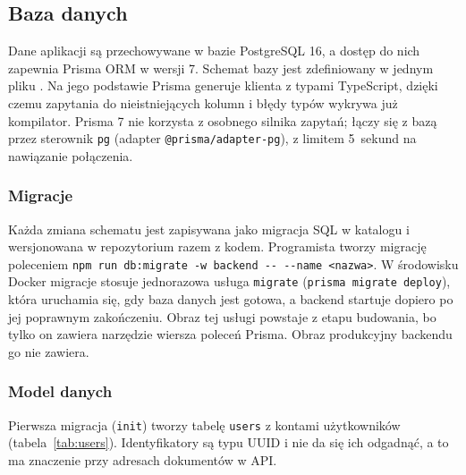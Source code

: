 \subsection{Baza danych}
\label{sec:baza-danych}

Dane aplikacji są przechowywane w bazie PostgreSQL 16,
a dostęp do nich zapewnia Prisma ORM w wersji 7. Schemat bazy
jest zdefiniowany w jednym pliku .
Na jego podstawie Prisma generuje klienta z typami TypeScript, dzięki czemu
zapytania do nieistniejących kolumn i błędy typów wykrywa już kompilator. Prisma 7 nie
korzysta z osobnego silnika zapytań; łączy się z bazą przez sterownik
\texttt{pg} (adapter \texttt{@prisma/adapter-pg}), z limitem 5~sekund na
nawiązanie połączenia.

\subsubsection{Migracje}

Każda zmiana schematu jest zapisywana jako migracja SQL w katalogu
 i wersjonowana w repozytorium razem
z kodem. Programista tworzy migrację poleceniem
\verb|npm run db:migrate -w backend -- --name <nazwa>|. W środowisku Docker
migracje stosuje jednorazowa usługa \texttt{migrate}
(\texttt{prisma migrate deploy}), która uruchamia się, gdy baza danych jest
gotowa, a backend startuje dopiero po jej poprawnym zakończeniu. Obraz tej
usługi powstaje z etapu budowania, bo tylko on zawiera narzędzie wiersza
poleceń Prisma. Obraz produkcyjny backendu go nie zawiera.

\subsubsection{Model danych}

Pierwsza migracja (\texttt{init}) tworzy tabelę \texttt{users} z kontami
użytkowników (tabela~\ref{tab:users}). Identyfikatory są typu UUID i nie
da się ich odgadnąć, a to ma znaczenie przy adresach dokumentów w API.

